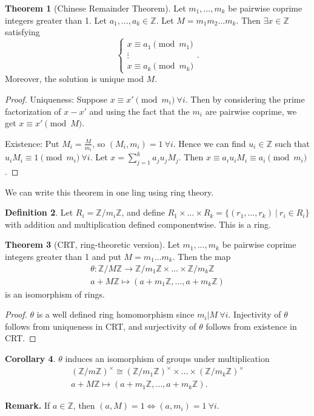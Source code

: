 \documentclass{article}
\theoremstyle{definition}
\newtheorem{theorem}{Theorem}[section]
\newtheorem{cor}[theorem]{Corollary}
\newtheorem{defn}[theorem]{Definition}
\theoremstyle{remark}
\begin{document}
\begin{theorem}[Chinese Remainder Theorem]
    Let $m_1,\ldots, m_k$ be pairwise coprime integers greater than 1. Let $a_1,\ldots, a_k \in \mathbb{Z}$. Let $M = m_1 m_2 \ldots m_k$. Then $\exists  x \in \mathbb{Z}$ satisfying 
    \[
    \begin{cases}
        x \equiv a_1 \pmod{m_1} \\
        \vdots \\
        x \equiv a_k \pmod{m_k}
        \end{cases}.
    \]
        Moreover, the solution is unique mod $M$.
\end{theorem}
\begin{proof}
    Uniqueness: Suppose $x \equiv x' \pmod{m_i} ~\forall i$. Then by considering the prime factorization of $x-x'$ and using the fact that the $m_i$ are pairwise coprime, we get $x \equiv x' \pmod{M}$.
    \vspace{1mm}
    
    Existence: Put $M_i = \frac{M}{m_i}$, so $(M_i, m_i) = 1 ~\forall i$. Hence we can find $u_i \in \mathbb{Z}$ such that $u_i M_i \equiv 1 \pmod{m_i} ~\forall i$. Let $x = \sum_{j=1}^{k} a_j u_j M_j$. Then $x \equiv a_iu_iM_i \equiv a_i \pmod{m_i}$.
\end{proof}
We can write this theorem in one ling using ring theory.
\begin{defn}
    Let $R_i = \mathbb{Z}/m_i\mathbb{Z}$, and define $R_1 \times \ldots \times R_k = \{(r_1,\ldots,r_k) ~|~ r_i \in R_i\}$ with addition and multiplication defined componentwise. This is a ring.
\end{defn}
\begin{theorem}[CRT, ring-theoretic version] %
    Let $m_1,\ldots, m_k$ be pairwise coprime integers greater than 1 and put $M = m_1\ldots m_k$. Then the map 
    \begin{align*}
        \theta: \mathbb{Z}/M\mathbb{Z} \to \mathbb{Z}/m_1\mathbb{Z} \times \ldots \times \mathbb{Z}/m_k\mathbb{Z} \\
        a + M\mathbb{Z} \mapsto (a + m_1\mathbb{Z}, \ldots, a + m_k\mathbb{Z})
    \end{align*}
    is an isomorphism of rings.
\end{theorem}
\begin{proof}
    $\theta$ is a well defined ring homomorphism since $m_i | M ~\forall i$. Injectivity of $\theta$ follows from uniqueness in CRT, and surjectivity of $\theta$ follows from existence in CRT.
\end{proof}
\begin{cor}
    $\theta$ induces an isomorphism of groups under multiplication 
    \begin{align*}
        (\mathbb{Z}/m\mathbb{Z})^\times \cong (\mathbb{Z}/m_1\mathbb{Z})^\times \times \ldots \times (\mathbb{Z}/m_k\mathbb{Z})^\times \\
        a + M\mathbb{Z} \mapsto (a + m_1\mathbb{Z}, \ldots, a+m_k\mathbb{Z}).
    \end{align*}
\end{cor}
\textbf{Remark.} If $a \in \mathbb{Z}$, then $(a,M) = 1 \iff (a,m_i) = 1 ~\forall i$.
\end{document}
